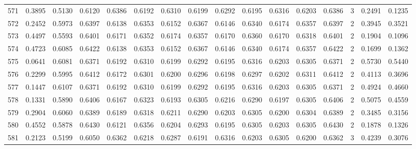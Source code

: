 \begin{tabular}{lrrrrrrrrrrrrrrr}
571 &      0.3895 &  0.5130 &  0.6120 &  0.6386 &  0.6192 &  0.6310 &  0.6199 &  0.6292 &  0.6195 &  0.6316 &   0.6203 &     0.6386 &      3 &                    0.2491 &                     0.1235 \\
572 &      0.2452 &  0.5973 &  0.6397 &  0.6138 &  0.6353 &  0.6152 &  0.6367 &  0.6146 &  0.6340 &  0.6174 &   0.6357 &     0.6397 &      2 &                    0.3945 &                     0.3521 \\
573 &      0.4497 &  0.5593 &  0.6401 &  0.6171 &  0.6352 &  0.6174 &  0.6357 &  0.6170 &  0.6360 &  0.6170 &   0.6318 &     0.6401 &      2 &                    0.1904 &                     0.1096 \\
574 &      0.4723 &  0.6085 &  0.6422 &  0.6138 &  0.6353 &  0.6152 &  0.6367 &  0.6146 &  0.6340 &  0.6174 &   0.6357 &     0.6422 &      2 &                    0.1699 &                     0.1362 \\
575 &      0.0641 &  0.6081 &  0.6371 &  0.6192 &  0.6310 &  0.6199 &  0.6292 &  0.6195 &  0.6316 &  0.6203 &   0.6305 &     0.6371 &      2 &                    0.5730 &                     0.5440 \\
576 &      0.2299 &  0.5995 &  0.6412 &  0.6172 &  0.6301 &  0.6200 &  0.6296 &  0.6198 &  0.6297 &  0.6202 &   0.6311 &     0.6412 &      2 &                    0.4113 &                     0.3696 \\
577 &      0.1447 &  0.6107 &  0.6371 &  0.6192 &  0.6310 &  0.6199 &  0.6292 &  0.6195 &  0.6316 &  0.6203 &   0.6305 &     0.6371 &      2 &                    0.4924 &                     0.4660 \\
578 &      0.1331 &  0.5890 &  0.6406 &  0.6167 &  0.6323 &  0.6193 &  0.6305 &  0.6216 &  0.6290 &  0.6197 &   0.6305 &     0.6406 &      2 &                    0.5075 &                     0.4559 \\
579 &      0.2904 &  0.6060 &  0.6389 &  0.6189 &  0.6318 &  0.6211 &  0.6290 &  0.6203 &  0.6305 &  0.6200 &   0.6304 &     0.6389 &      2 &                    0.3485 &                     0.3156 \\
580 &      0.4552 &  0.5878 &  0.6430 &  0.6121 &  0.6356 &  0.6204 &  0.6293 &  0.6195 &  0.6305 &  0.6203 &   0.6305 &     0.6430 &      2 &                    0.1878 &                     0.1326 \\
581 &      0.2123 &  0.5199 &  0.6050 &  0.6362 &  0.6218 &  0.6287 &  0.6191 &  0.6316 &  0.6203 &  0.6305 &   0.6200 &     0.6362 &      3 &                    0.4239 &                     0.3076 \\

\end{tabular}
